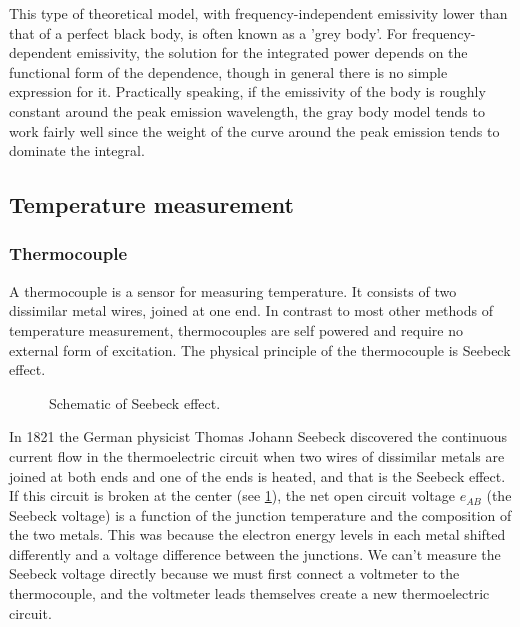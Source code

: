 This type of theoretical model, with frequency-independent emissivity lower than that of a perfect black body, is often known as a 'grey body'. For frequency-dependent emissivity, the solution for the integrated power depends on the functional form of the dependence, though in general there is no simple expression for it. Practically speaking, if the emissivity of the body is roughly constant around the peak emission wavelength, the gray body model tends to work fairly well since the weight of the curve around the peak emission tends to dominate the integral.

\subsection{Temperature measurement}
\subsubsection{Thermocouple}
A thermocouple is a sensor for measuring temperature.
It consists of two dissimilar metal wires, joined at one end.
In contrast to most other methods of temperature measurement, thermocouples are self powered and require no external form of excitation.
The physical principle of the thermocouple is Seebeck effect.

\begin{figure}[!htp]
\centering{}
\caption{Schematic of Seebeck effect.}
\label{Fig:Seebeck_Voltage}
\end{figure}
In 1821 the German physicist Thomas Johann Seebeck discovered the continuous current flow in the thermoelectric circuit when two wires of dissimilar metals are joined at both ends and one of the ends is heated, and that is the Seebeck effect.
If this circuit is broken at the center (see \ref{Fig:Seebeck_Voltage}), the net open circuit voltage $e_{AB}$ (the Seebeck voltage) is a function of the junction temperature and the composition of the two metals.
This was because the electron energy levels in each metal shifted differently and a voltage difference between the junctions.
We can't measure the Seebeck voltage directly because we must first connect a voltmeter to the thermocouple, and the voltmeter leads themselves create a new thermoelectric circuit.

